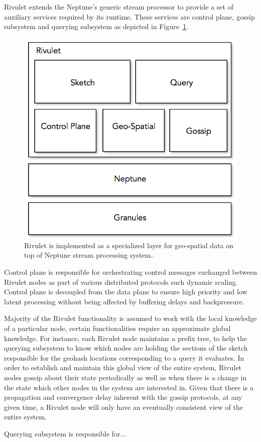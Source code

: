 Rivulet extends the Neptune's generic stream processor to provide a set of auxiliary services required by its runtime.
These services are control plane, gossip subsystem and querying subsystem as depicted in Figure~\ref{fig:rivulet-archi}.
%
\begin{figure}
    \centerline{\includegraphics[scale=0.5]{figures/rivulet-archi.png}}
    \caption{Rivulet is implemented as a specialized layer for geo-spatial data on top of Neptune stream processing system..}
    \label{fig:rivulet-archi}
\end{figure}
%
\begin{description}[leftmargin=*]
	\item[Control plane:] Control plane is responsible for orchestrating control messages exchanged between Rivulet nodes as part of various distributed protocols such dynamic scaling.
	Control plane is decoupled from the data plane to ensure high priority and low latent processing without being affected by buffering delays and backpressure.

	\item[Gossip subsystem:] Majority of the Rivulet functionality is assumed to work with the local knowledge of a particular node, certain functionalities require an approximate global knowledge. 
	For instance, each Rivulet node maintains a prefix tree, to help the querying subsystem to know which nodes are holding the sections of the sketch responsible for the geohash locations corresponding to a query it evaluates. 
	In order to establish and maintain this global view of the entire system, Rivulet nodes gossip about their state periodically as well as when there is a change in the state which other nodes in the system are interested in.
	Given that there is a propagation and convergence delay inherent with the gossip protocols, at any given time, a Rivulet node will only have an eventually consistent view of the entire system.

	\item[Querying subsystem:] Querying subsystem is responsible for...
\end{description} 


